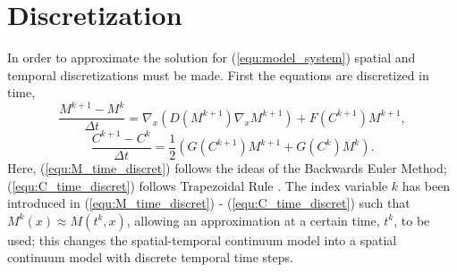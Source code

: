 \section{Discretization}

In order to approximate the solution for (\ref{equ:model_system}) spatial and temporal discretizations must be made.
First the equations are discretized in time,
\begin{equation} \label{equ:M_time_discret}
  \frac{M^{k+1} - M^{k}}{\Delta t} = \nabla_x (D(M^{k+1}) \nabla_x M^{k+1}) + F(C^{k+1}) M^{k+1},
\end{equation}
\begin{equation} \label{equ:C_time_discret}
  \frac{C^{k+1} - C^{k}}{\Delta t} = \frac{1}{2} ( G(C^{k+1}) M^{k+1} + G(C^{k}) M^{k} ).
\end{equation}
Here, (\ref{equ:M_time_discret}) follows the ideas of the Backwards Euler Method; (\ref{equ:C_time_discret}) follows Trapezoidal Rule \citep{burden2010numerical}. 
The index variable $k$ has been introduced in (\ref{equ:M_time_discret}) - (\ref{equ:C_time_discret}) such that $M^{k}(x) \approx M(t^{k}, x)$, allowing an approximation at a certain time, $t^{k}$, to be used; this changes the spatial-temporal continuum model into a spatial continuum model with discrete temporal time steps. 

